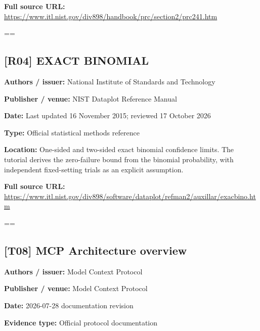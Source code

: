 \documentclass[10pt,letterpaper]{article}
\begin{document}
\textbf{Full source URL:} \href{https://www.itl.nist.gov/div898/handbook/prc/section2/prc241.htm}{\small\ttfamily https:/\allowbreak{}/\allowbreak{}www.\allowbreak{}itl.\allowbreak{}nist.\allowbreak{}gov/\allowbreak{}div898/\allowbreak{}handbook/\allowbreak{}prc/\allowbreak{}section2/\allowbreak{}prc241.\allowbreak{}htm}\par
\egroup\par\noindent\box\readingEntry\par\medskip
\setbox\readingEntry=\vbox\bgroup\hsize=\linewidth\subsection*{[R04] EXACT BINOMIAL}
\textbf{Authors / issuer:} National Institute of Standards and Technology\par
\textbf{Publisher / venue:} NIST Dataplot Reference Manual\par
\textbf{Date:} Last updated 16 November 2015; reviewed 17 October 2026\par
\textbf{Type:} Official statistical methods reference\par
\textbf{Location:} One-sided and two-sided exact binomial confidence limits. The tutorial derives the zero-failure bound from the binomial probability, with independent fixed-setting trials as an explicit assumption.\par
\textbf{Full source URL:} \href{https://www.itl.nist.gov/div898/software/dataplot/refman2/auxillar/exacbino.htm}{\small\ttfamily https:/\allowbreak{}/\allowbreak{}www.\allowbreak{}itl.\allowbreak{}nist.\allowbreak{}gov/\allowbreak{}div898/\allowbreak{}software/\allowbreak{}dataplot/\allowbreak{}refman2/\allowbreak{}auxillar/\allowbreak{}exacbino.\allowbreak{}htm}\par
\egroup\par\noindent\box\readingEntry\par\medskip
\setbox\readingEntry=\vbox\bgroup\hsize=\linewidth\subsection*{[T08] MCP Architecture overview}
\textbf{Authors / issuer:} Model Context Protocol\par
\textbf{Publisher / venue:} Model Context Protocol\par
\textbf{Date:} 2026-07-28 documentation revision\par
\textbf{Evidence type:} Official protocol documentation\par
\end{document}
